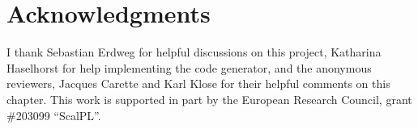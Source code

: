 \documentclass{book}
\begin{document}




\begin{oldSec}

\end{oldSec}

\begin{oldSec}

\end{oldSec}





\chapter*{Acknowledgments}
I thank Sebastian Erdweg for helpful discussions on
this project, Katharina Haselhorst for help
implementing the code generator, and the anonymous reviewers, Jacques Carette and Karl Klose
for their helpful comments on this chapter.
This work is supported in part by the European Research Council, grant \#203099 ``ScalPL''.
\end{document}
